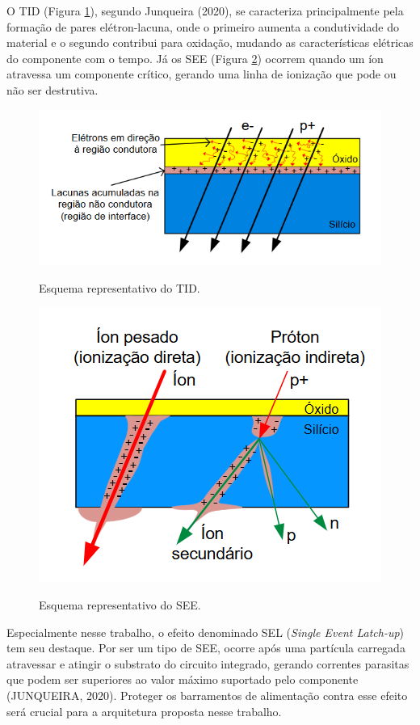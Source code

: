 O TID (Figura \ref{fig:tid}), segundo Junqueira (2020), se caracteriza principalmente pela formação de pares elétron-lacuna, onde o primeiro aumenta a condutividade do material e o segundo contribui para oxidação, mudando as características elétricas do componente com o tempo.  Já os SEE (Figura \ref{fig:see}) ocorrem quando um íon atravessa um componente crítico, gerando uma linha de ionização que pode ou não ser destrutiva. 

\begin{figure}[H]
    \centering
    \caption{Esquema representativo do TID.}
    \includegraphics[scale=0.8]{images/tid.png}
    \label{fig:tid}
\end{figure}

\begin{figure}[H]
    \centering
    \caption{Esquema representativo do SEE.}
    \includegraphics[scale=0.8]{images/see.png}
    \label{fig:see}
\end{figure}

Especialmente nesse trabalho, o efeito denominado SEL (\textit{Single Event Latch-up}) tem seu destaque. Por ser um tipo de SEE, ocorre após uma partícula carregada atravessar e atingir o substrato do circuito integrado, gerando correntes parasitas que podem ser superiores ao valor máximo suportado pelo componente (JUNQUEIRA, 2020). Proteger os barramentos de alimentação contra esse efeito será crucial para a arquitetura proposta nesse trabalho.

